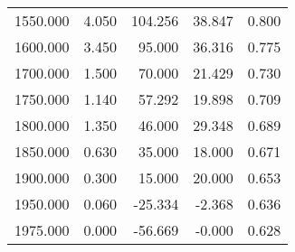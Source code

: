 \begin{tabular}{rrrrr}
1550.000 & 4.050 & 104.256 & 38.847 & 0.800 \\
1600.000 & 3.450 & 95.000 & 36.316 & 0.775 \\
1700.000 & 1.500 & 70.000 & 21.429 & 0.730 \\
1750.000 & 1.140 & 57.292 & 19.898 & 0.709 \\
1800.000 & 1.350 & 46.000 & 29.348 & 0.689 \\
1850.000 & 0.630 & 35.000 & 18.000 & 0.671 \\
1900.000 & 0.300 & 15.000 & 20.000 & 0.653 \\
1950.000 & 0.060 & -25.334 & -2.368 & 0.636 \\
1975.000 & 0.000 & -56.669 & -0.000 & 0.628 \\
\bottomrule
\end{tabular}
